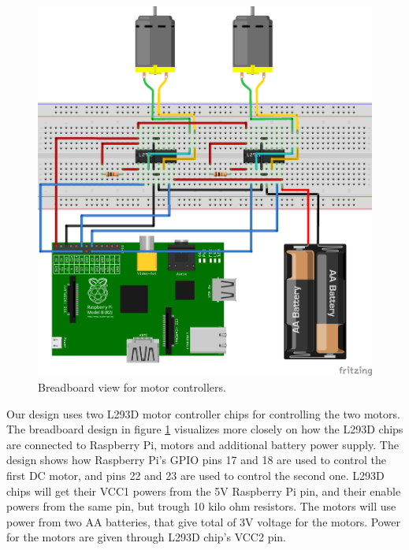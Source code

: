 \documentclass[english,11pt,twoside,a4paper]{article}
\begin{document}
\begin{figure}
  \begin{center}
    \includegraphics[scale=0.75]{motor_controllers_l293d_bb.png}
    \caption{Breadboard view for motor controllers.}
  \end{center}
  \label{l293d_bb}
\end{figure}

Our design uses two L293D motor controller chips for controlling the two motors. The breadboard design in figure \ref{l293d_bb} visualizes more closely on how the L293D chips are connected to Raspberry Pi, motors and additional battery power supply. The design shows how Raspberry Pi's GPIO pins 17 and 18 are used to control the first DC motor, and pins 22 and 23 are used to control the second one. L293D chips will get their VCC1 powers from the 5V Raspberry Pi pin, and their enable powers from the same pin, but trough 10 kilo ohm resistors. The motors will use power from two AA batteries, that give total of 3V voltage for the motors. Power for the motors are given through L293D chip's VCC2 pin.
\end{document}
